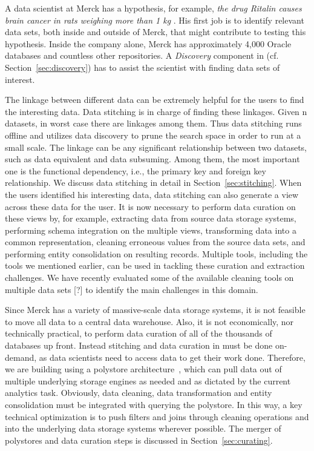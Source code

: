 \stitle{[Discovery]} A data scientist at Merck has a hypothesis, for example, {\it the drug Ritalin causes brain cancer in rats weighing more than 1 kg }.  His first job is to identify relevant data sets, both inside and outside of Merck, that might contribute to testing this hypothesis.  Inside the company alone, Merck has approximately  4,000 Oracle databases and countless other repositories.  A {\it Discovery} component in \dcv (cf. Section~\ref{sec:discovery}) has to assist the scientist with finding data sets of interest.

\stitle{[Stitching]} The linkage between different data can be extremely helpful for the users to find the interesting data. Data stitching is in charge of finding these linkages. Given n datasets, in worst case there are  linkages among them. Thus data stitching runs offline and utilizes data discovery to prune the search space in order to run at a small scale. The linkage can be any significant relationship between two datasets, such as data equivalent and data subsuming. Among them, the most important one is the functional dependency, i.e., the primary key and foreign key relationship. We discuss data stitching in detail in Section~\ref{sec:stitching}. When the users identified his interesting data, data stitching can also generate a view across these data for the user. It is now necessary to perform data curation on these views by, for example, extracting data from source data storage systems, performing schema integration on the multiple views, transforming data into a common representation, cleaning erroneous values from the source data sets, and performing entity consolidation on resulting records. Multiple tools, including the tools we mentioned earlier, can be used in tackling these curation and extraction challenges. We have recently evaluated some of the available cleaning tools on multiple data sets [?] to identify the main challenges in this domain.


 Since Merck has a variety of massive-scale data storage systems, it is  not feasible to move all data to a  central data warehouse. Also, it is not economically, nor technically practical, to perform data curation of all of the thousands of databases up front.
 Instead stitching and data curation in \dcv must be done on-demand, as data scientists need to access data to get
their work done.  Therefore, we are building \dcv using a polystore architecture~\cite{DBLP:journals/sigmod/DugganESBHKMMMZ15}, which  can pull data out of multiple underlying storage engines as needed and as dictated by the current analytics task.  Obviously, data cleaning, data transformation and entity consolidation must be integrated with querying the polystore.  In this way, a key technical optimization is to push filters and joins through cleaning operations and into the underlying data storage systems wherever possible.  The
merger of polystores and data curation steps is discussed in Section~\ref{sec:curating}.

